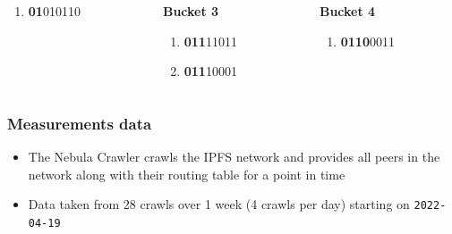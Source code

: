 \documentclass{pl-slide}
\begin{document}
\begin{frame}
\begin{columns}[onlytextwidth,t]
\begin{column}{0.19\textwidth}
\begin{enumerate}
   		\item \textbf{01}010110
   \end{enumerate}
\end{column}
\begin{column}{0.19\textwidth}
	\textbf{Bucket 3}
   \begin{enumerate}
   		\item \textbf{011}11011
   		\item \textbf{011}10001
   \end{enumerate}
\end{column}
\begin{column}{0.19\textwidth}
	\textbf{Bucket 4}
   	\begin{enumerate}
   		\item \textbf{0110}0011
   \end{enumerate}
\end{column}
\end{columns}
\end{frame}

\begin{frame}
\frametitle{Measurements data}
\begin{itemize}
    \item The Nebula Crawler crawls the IPFS network and provides all peers in the network along with their routing table for a point in time
    \item Data taken from 28 crawls over 1 week (4 crawls per day) starting on \texttt{2022-04-19}
\end{itemize}
\end{frame}
\end{document}
